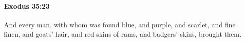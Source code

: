 
		\paragraph{Exodus 35:23} %
			\label{EXODUS-35-23}

			And every man, with whom was found blue, and purple, and scarlet, and fine linen, and goats' hair, and red skins of rams, and badgers' skins, brought them.


